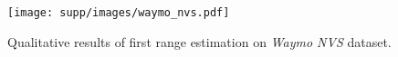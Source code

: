 \begin{figure}[t]
\centering
\texttt{[image: supp/images/waymo\_nvs.pdf]}

\caption{Qualitative results of first range estimation on \textit{Waymo NVS} dataset.}
\label{fig:iccv_supp_waymo_nvs}

\end{figure}